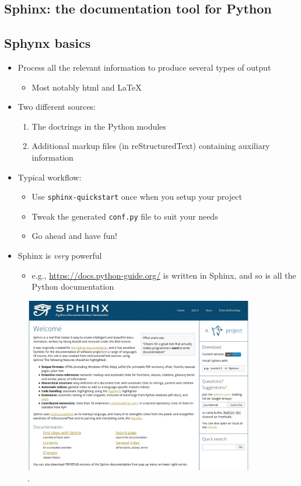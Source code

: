 \subsection{Sphinx: the documentation tool for Python}


\subsection{Sphynx basics}

  \begin{itemize}
  \item Process all the relevant information to produce several types of
    output
    \begin{itemize}
    \item Most notably html and LaTeX
    \end{itemize}
  \item Two different sources:
    \begin{enumerate}
    \item The doctrings in the Python modules
    \item Additional markup files (in reStructuredText) containing
      auxiliary information
    \end{enumerate}
  \item Typical workflow:
    \begin{itemize}
    \item Use \texttt{sphinx-quickstart} once when you setup your project
    \item Tweak the generated \texttt{conf.py} file to suit your needs
    \item Go ahead and have fun!
    \end{itemize}
  \item Sphinx is \emph{very} powerful
    \begin{itemize}
    \item e.g., \url{https://docs.python-guide.org/} is written in Sphinx,
      and so is all the Python documentation
    \end{itemize}
  \end{itemize}


\begin{figure}[ht]
    \centering
    \includegraphics[width=0.9\textwidth]{lez6/sphinx.png}
    \caption{.}
    \label{sphynx}
\end{figure}
\FloatBarrier

